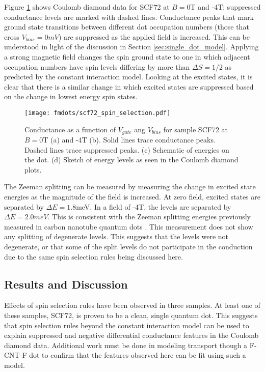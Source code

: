 Figure \ref{fig:scf72_spin_selection} shows Coulomb diamond data for SCF72 at $B=0$T and -4T; suppressed conductance levels are marked with dashed lines. Conductance peaks that mark ground state transitions between different dot occupation numbers (those that cross $V_{bias}=0mV$) are suppressed as the applied field is increased. This can be understood in light of the discussion in Section \ref{sec:single_dot_model}. Applying a strong magnetic field changes the spin ground state to one in which adjacent occupation numbers have spin levels differing by more than $\Delta S = 1/2$ as predicted by the constant interaction model. Looking at the excited states, it is clear that there is a similar change in which excited states are suppressed based on the change in lowest energy spin states.

\begin{figure}
    \centering
    \texttt{[image: fmdots/scf72\_spin\_selection.pdf]}
    \caption{Conductance as a function of $V_{gate}$ ang $V_{bias}$ for sample SCF72 at $B=0$T (a) and -4T (b). Solid lines trace conductance peaks. Dashed lines trace suppressed peaks. (c) Schematic of energies on the dot. (d) Sketch of energy levels as seen in the Coulomb diamond plots.}
    \label{fig:scf72_spin_selection}
\end{figure}

The Zeeman splitting can be measured by measuring the change in excited state energies as the magnitude of the field is increased. At zero field, excited states are separated by $\Delta E = 1.8$meV. In a field of -4T, the levels are separated by $\Delta E = 2.0meV$.  This is consistent with the Zeeman splitting energies previously measured in carbon nanotube quantum dots \cite{Cobden1998, Lai2014}. This measurement does not show any splitting of degenerate levels. This suggests that the levels were not degenerate, or that some of the split levels do not participate in the conduction due to the same spin selection rules being discussed here.

\subsection{Results and Discussion}

Effects of spin selection rules have been observed in three samples. At least one of these samples, SCF72, is proven to be a clean, single quantum dot. This suggests that spin selection rules beyond the constant interaction model can be used to explain suppressed and negative differential conductance features in the Coulomb diamond data. Additional work must be done in modeling transport though a F-CNT-F dot to confirm that the features observed here can be fit using such a model. 

